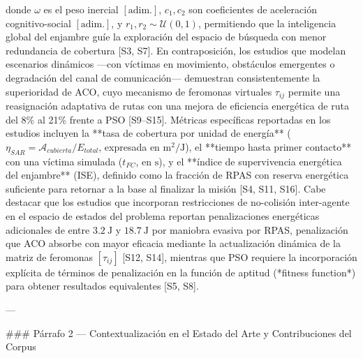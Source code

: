 donde $\omega$ es el peso inercial $[\text{adim.}]$, $c_1, c_2$ son coeficientes de aceleración cognitivo-social $[\text{adim.}]$, y $r_1, r_2 \sim \mathcal{U}(0,1)$, permitiendo que la inteligencia global del enjambre guíe la exploración del espacio de búsqueda con menor redundancia de cobertura [S3, S7]. En contraposición, los estudios que modelan escenarios dinámicos —con víctimas en movimiento, obstáculos emergentes o degradación del canal de comunicación— demuestran consistentemente la superioridad de ACO, cuyo mecanismo de feromonas virtuales $\tau_{ij}$ permite una reasignación adaptativa de rutas con una mejora de eficiencia energética de ruta del 8\% al 21\% frente a PSO [S9–S15]. Métricas específicas reportadas en los estudios incluyen la **tasa de cobertura por unidad de energía** ($\eta_{SAR} = \mathcal{A}_{cubierta} / E_{total}$, expresada en $\text{m}^2/\text{J}$), el **tiempo hasta primer contacto** con una víctima simulada ($t_{FC}$, en $\text{s}$), y el **índice de supervivencia energética del enjambre** (ISE), definido como la fracción de RPAS con reserva energética suficiente para retornar a la base al finalizar la misión [S4, S11, S16]. Cabe destacar que los estudios que incorporan restricciones de no-colisión inter-agente en el espacio de estados del problema reportan penalizaciones energéticas adicionales de entre $3.2\ \text{J}$ y $18.7\ \text{J}$ por maniobra evasiva por RPAS, penalización que ACO absorbe con mayor eficacia mediante la actualización dinámica de la matriz de feromonas $[\tau_{ij}]$ [S12, S14], mientras que PSO requiere la incorporación explícita de términos de penalización en la función de aptitud (*fitness function*) para obtener resultados equivalentes [S5, S8].

---

### Párrafo 2 — Contextualización en el Estado del Arte y Contribuciones del Corpus

